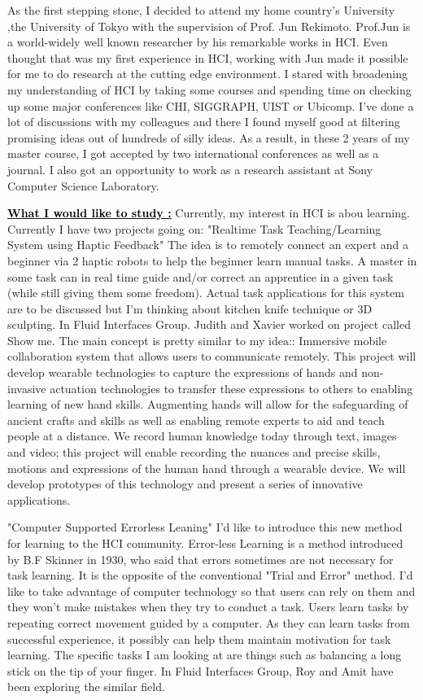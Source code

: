 \documentclass{article}
\newcommand{\statement}[1]{\par\medskip
  \underline{\textcolor{black}{\textbf{#1:}}}\space
}
\begin{document}
As the first stepping stone, I decided to attend my home country's University ,the University of Tokyo with the supervision of Prof. Jun Rekimoto. Prof.Jun is a world-widely well known researcher by his remarkable works in HCI. Even thought that was my first experience in HCI, working with Jun made it possible for me to do research at the cutting edge environment. I stared with broadening my understanding of HCI by taking some courses and spending time on checking up some major conferences like CHI, SIGGRAPH, UIST or Ubicomp. I've done a lot of discussions with my colleagues and there I found myself good at filtering promising ideas out of hundreds of silly ideas. As a result, in these 2 years of my master course, I got accepted by two international conferences as well as a journal. I also got an opportunity to work as a research assistant at Sony Computer Science Laboratory. 


\statement{What I would like to study } Currently, my interest in HCI is abou learning. Currently I have two projects going on:
"Realtime Task Teaching/Learning System using Haptic Feedback"
The idea is to remotely connect an expert and a beginner via 2 haptic robots to help the beginner learn manual tasks. A master in some task can in real time guide and/or correct an apprentice in a given task (while still giving them some freedom). Actual task applications for this system are to be discussed but I'm thinking about kitchen knife technique or 3D sculpting. In Fluid Interfaces Group. Judith and Xavier worked on project called Show me. The main concept is pretty similar to my idea:: Immersive mobile collaboration system that allows users to communicate remotely. This project will develop wearable technologies to capture the expressions of hands and non-invasive actuation technologies to transfer these expressions to others to enabling learning of new hand skills. Augmenting hands will allow for the safeguarding of ancient crafts and skills as well as enabling remote experts to aid and teach people at a distance. We record human knowledge today through text, images and video; this project will enable recording the nuances and precise skills, motions and expressions of the human hand through a wearable device. We will develop prototypes of this technology and present a series of innovative applications.


"Computer Supported Errorless Leaning" 
I'd like to introduce this new method for learning to the HCI community. Error-less Learning is a method introduced by B.F Skinner in 1930, who said that errors sometimes are not necessary for task learning. It is the opposite of the conventional "Trial and Error" method. I'd like to take advantage of computer technology so that users can rely on them and they won't make mistakes when they try to conduct a task. Users learn tasks by repeating correct movement guided by a computer. As they can learn tasks from successful experience, it possibly can help them  maintain motivation for task learning. The specific tasks I am looking at are things such as balancing a long stick on the tip of your finger. In Fluid Interfaces Group, Roy and Amit have been exploring the similar field. 
\end{document}
